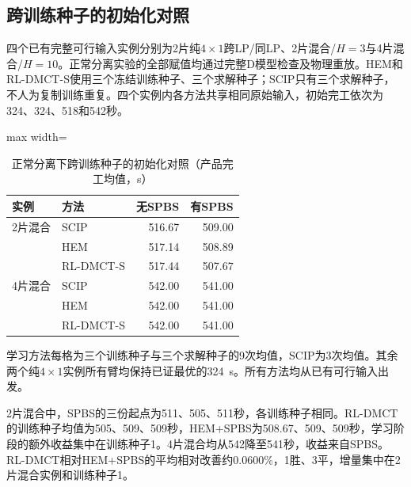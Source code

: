 \subsection{跨训练种子的初始化对照}\label{sec:journal-training-cn}
四个已有完整可行输入实例分别为2片纯$4\times1$跨LP/同LP、2片混合/$H=3$与4片混合/$H=10$。正常分离实验的全部赋值均通过完整D模型检查及物理重放。HEM和RL-DMCT-S使用三个冻结训练种子、三个求解种子；SCIP只有三个求解种子，不人为复制训练重复。四个实例内各方法共享相同原始输入，初始完工依次为324、324、518和542秒。
\begin{table}[!htbp]
\centering\small
\caption{正常分离下跨训练种子的初始化对照（产品完工均值，s）}
\label{tab:journal-training-cn}
\begin{adjustbox}{max width=\linewidth}
\begin{tabular}{llrr}\toprule
实例 & 方法 & 无SPBS & 有SPBS\\\midrule
2片混合 & SCIP & 516.67 & 509.00\\
 & HEM & 517.14 & 508.89\\
 & RL-DMCT-S & 517.44 & 507.67\\
4片混合 & SCIP & 542.00 & 541.00\\
 & HEM & 542.00 & 541.00\\
 & RL-DMCT-S & 542.00 & 541.00\\
\bottomrule\end{tabular}
\end{adjustbox}
\par\smallskip\footnotesize 学习方法每格为三个训练种子与三个求解种子的9次均值，SCIP为3次均值。其余两个纯$4\times1$实例所有臂均保持已证最优的324~s。所有方法均从已有可行输入出发。
\end{table}
2片混合中，SPBS的三份起点为511、505、511秒，各训练种子相同。RL-DMCT的训练种子均值为505、509、509秒，HEM+SPBS为508.67、509、509秒，学习阶段的额外收益集中在训练种子1。4片混合均从542降至541秒，收益来自SPBS。RL-DMCT相对HEM+SPBS的平均相对改善约0.0600\%，1胜、3平，增量集中在2片混合实例和训练种子1。
